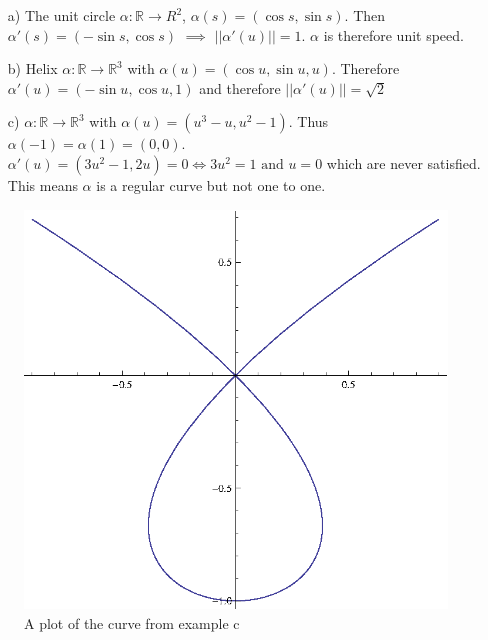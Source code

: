 \begin{itemize}

\item[a)] The unit circle $\alpha : \mathbb{R} \rightarrow R^2$, $\alpha (s) = (\cos s, \sin s)$. Then $\alpha ' (s) = (-\sin s, \cos s)$ $\implies$ $||\alpha ' (u) || = 1$. $\alpha$ is therefore unit speed.
\item[b)] Helix $\alpha : \mathbb{R} \rightarrow \mathbb{R}^3$ with $\alpha (u) = (\cos u, \sin u, u)$. Therefore $\alpha ' (u) = (- \sin u, \cos u, 1)$ and therefore $||\alpha ' (u) || = \sqrt{2}$
\item[c)] $\alpha : \mathbb{R} \rightarrow \mathbb{R}^3$ with $\alpha (u) = (u^3 - u, u^2 -1)$. Thus $\alpha (-1) = \alpha(1) = (0,0)$. $\alpha ' (u) = (3u^2 - 1, 2u) = 0 \Leftrightarrow 3u^2 = 1 \, \, \text{and} \, \, u = 0$ which are never satisfied. This means $\alpha$ is a regular curve but not one to one.

\end{itemize}

\begin{figure}[h]
\centering
\includegraphics{img/lect1-1.eps}
\caption{A plot of the curve from example c}
\end{figure}